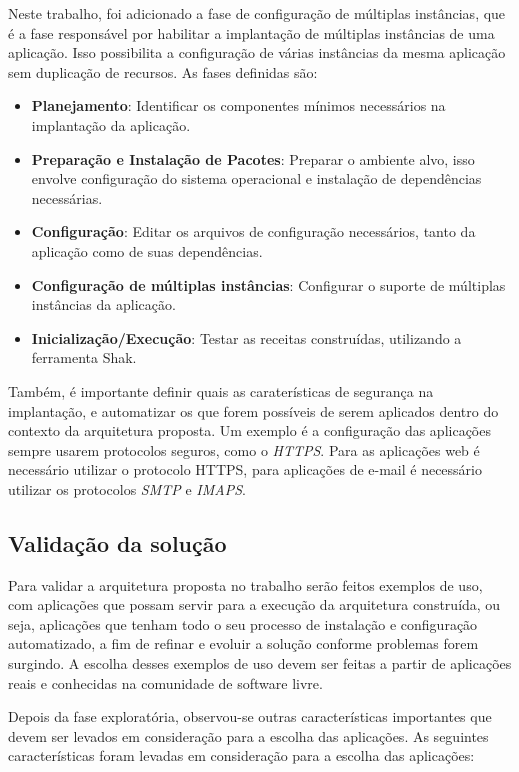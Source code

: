 Neste trabalho, foi adicionado a fase de configuração de múltiplas
instâncias, que é a fase responsável por habilitar a implantação de múltiplas 
instâncias de uma aplicação. Isso possibilita a configuração 
de várias instâncias da mesma aplicação sem duplicação de recursos. As fases 
definidas são:

\begin{itemize}
  \item  \textbf{Planejamento}: Identificar os componentes mínimos necessários na implantação
 da aplicação.  
  \item  \textbf{Preparação e Instalação de Pacotes}: Preparar o ambiente alvo, 
isso envolve configuração do sistema operacional e instalação de dependências necessárias.
  \item  \textbf{Configuração}: Editar os arquivos de configuração necessários, tanto 
da aplicação como de suas dependências.
  \item  \textbf{Configuração de múltiplas instâncias}: Configurar o suporte de múltiplas instâncias
da aplicação.   
  \item  \textbf{Inicialização/Execução}: Testar as receitas construídas, utilizando
a ferramenta Shak. 
\end{itemize}

Também, é importante definir quais as caraterísticas de segurança na implantação, e
automatizar os que forem possíveis de serem aplicados dentro do contexto da
arquitetura proposta. Um exemplo
é a configuração das aplicações sempre usarem protocolos seguros, como o \textit{HTTPS}. 
Para as aplicações web é necessário utilizar o protocolo HTTPS, para aplicações
de e-mail é necessário utilizar os protocolos \textit{SMTP} e \textit{IMAPS}.

\subsection{Validação da solução}
\label{subsection:validacao}

Para validar a arquitetura proposta no trabalho serão feitos exemplos de uso,
com aplicações que possam servir para a execução da arquitetura construída, ou seja,
aplicações que tenham todo o seu processo de instalação e configuração automatizado, a
fim de refinar e evoluir a solução conforme problemas forem surgindo. A escolha
desses exemplos de uso devem ser feitas a partir de aplicações reais e
conhecidas na comunidade de software livre. 

Depois da fase exploratória, observou-se outras características importantes que 
devem ser levados em consideração para a escolha das aplicações. As seguintes 
características foram levadas em consideração para a escolha das aplicações:

